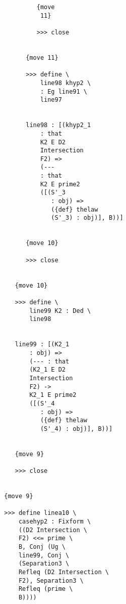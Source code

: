 \documentclass[12pt]{article}
\begin{document}
\begin{verbatim}
                                    {move 
                                     11}

                                    >>> close


                                 {move 11}

                                 >>> define \
                                     line98 khyp2 \
                                     : Eg line91 \
                                     line97


                                 line98 : [(khyp2_1 
                                     : that 
                                     K2 E D2 
                                     Intersection 
                                     F2) => 
                                     (--- 
                                     : that 
                                     K2 E prime2 
                                     ([(S'_3 
                                        : obj) => 
                                        ({def} thelaw 
                                        (S'_3) : obj)], B))]


                                 {move 10}

                                 >>> close


                              {move 10}

                              >>> define \
                                  line99 K2 : Ded \
                                  line98


                              line99 : [(K2_1 
                                  : obj) => 
                                  (--- : that 
                                  (K2_1 E D2 
                                  Intersection 
                                  F2) -> 
                                  K2_1 E prime2 
                                  ([(S'_4 
                                     : obj) => 
                                     ({def} thelaw 
                                     (S'_4) : obj)], B))]


                              {move 9}

                              >>> close


                           {move 9}

                           >>> define linea10 \
                               casehyp2 : Fixform \
                               ((D2 Intersection \
                               F2) <<= prime \
                               B, Conj (Ug \
                               line99, Conj \
                               (Separation3 \
                               Refleq (D2 Intersection \
                               F2), Separation3 \
                               Refleq (prime \
                               B))))



\end{verbatim}
\end{document}
